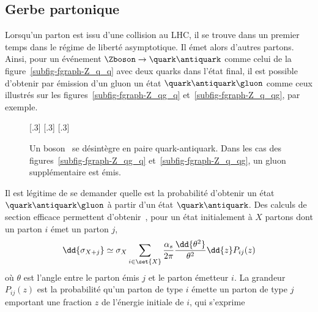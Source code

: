 \subsection{Gerbe partonique}\label{chapter-JERC-section-jets-subsec-gerbe-partonique}
Lorsqu'un parton est issu d'une collision au LHC, il se trouve dans un premier temps dans le régime de liberté asymptotique. Il émet alors d'autres partons. Ainsi, pour un événement $\Zboson\to\quark\antiquark$ comme celui de la figure~\ref{subfig-fgraph-Z_q_q} avec deux quarks dans l'état final, il est possible d'obtenir par émission d'un gluon un état $\quark\antiquark\gluon$ comme ceux illustrés sur les figures~\ref{subfig-fgraph-Z_qg_q} et~\ref{subfig-fgraph-Z_q_qg}, par exemple.
\begin{figure}[h]
\centering\vspace{\baselineskip}
\subcaptionbox{\label{subfig-fgraph-Z_q_q}}[.3\textwidth]
{\vspace{\baselineskip}}
\hfill
\subcaptionbox{\label{subfig-fgraph-Z_qg_q}}[.3\textwidth]
{\vspace{\baselineskip}}
\hfill
\subcaptionbox{\label{subfig-fgraph-Z_q_qg}}[.3\textwidth]
{\vspace{\baselineskip}}
\caption[Un boson \Zboson\ se désintègre en paire quark-antiquark.]{Un boson \Zboson\ se désintègre en paire quark-antiquark. Dans les cas des figures~\ref{subfig-fgraph-Z_qg_q} et~\ref{subfig-fgraph-Z_q_qg}, un gluon supplémentaire est émis.}
\label{fig-fgraph-Z_q_q_xg}
\end{figure}
\par Il est légitime de se demander quelle est la probabilité d'obtenir un état $\quark\antiquark\gluon$ à partir d'un état $\quark\antiquark$.
Des calculs de section efficace permettent d'obtenir~\cite{salam2010elements}, pour un état initialement à $X$ partons dont un parton $i$ émet un parton $j$,
\begin{equation}
\dd{\sigma_{X+j}} \simeq \sigma_{X} \sum_{i\in\set{X}} \frac{\alpha_s}{2\pi} \frac{\dd{\theta^2}}{\theta^2} \dd{z} P_{ij}(z)
\end{equation}
où $\theta$ est l'angle entre le parton émis $j$ et le parton émetteur $i$. La grandeur $P_{ij}(z)$ est la probabilité qu'un parton de type $i$ émette un parton de type $j$ emportant une fraction $z$ de l'énergie initiale de $i$, qui s'exprime
